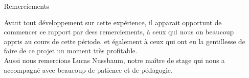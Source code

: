 Remerciements

Avant tout développement sur cette expérience, il apparait opportunt de commencer ce rapport par dess remerciements, à ceux qui nous on beaucoup appris au cours de cette période, et également à ceux qui ont eu la gentillesse de faire de ce projet un moment très profitable.\\
Aussi nous remercions Lucas Nussbaum, notre maître de stage qui nous a accompagné avec beaucoup de patience et de pédagogie. 
